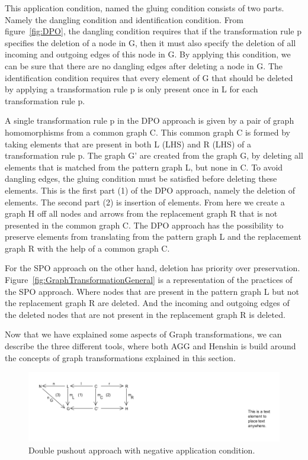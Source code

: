 \noindent This application condition, named the gluing condition\cite{Loewe1997}
consists of two parts. Namely the dangling condition and identification
condition. From figure~\ref{fig:DPO}, the dangling condition requires that if
the transformation rule p specifies the deletion of a node in G, then it must also
specify the deletion of all incoming and outgoing edges of this node in G. By
applying this condition, we can be sure that there are no dangling edges after
deleting a node in G. The identification condition requires that every element
of G that should be deleted by applying a transformation rule p is only present
once in L for each transformation rule p. 

A single transformation rule p in the DPO approach is given by a pair of graph
homomorphisms from a common graph C. This common graph C is formed by taking
elements that are present in both L (LHS) and R (LHS) of a transformation rule
p. The graph G' are created from the graph G, by deleting all elements that is
matched from the pattern graph L, but none in C. To avoid dangling edges,
the gluing condition must be satisfied before deleting these elements. This is
the first part (1) of the DPO approach, namely the deletion of elements. The
second part (2) is insertion of elements. From here we create a graph H off all
nodes and arrows from the replacement graph R that is not presented in the
common graph C. The DPO approach has the possibility to preserve elements from
translating from the pattern graph L and the replacement graph R with the help
of a common graph C.

For the SPO approach on the other hand, deletion has priority over preservation.
Figure~\ref{fig:GraphTransformationGeneral} is a representation of the practices
of the SPO approach. Where nodes that are present in the pattern graph L but not
the replacement graph R are deleted. And the incoming and outgoing edges of the
deleted nodes that are not present in the replacement graph R is deleted.

Now that we have explained some aspects of Graph transformations, we can
describe the three different tools, where both AGG and Henshin is build around
the concepts of graph transformations explained in this section. 

\begin{figure}[H]
	\centering
	\includegraphics[scale=0.7]{./Figures/Double_Pushout_NAC.png}
	\caption[The Double Pushout approach with NAC]
	{Double pushout approach with negative application condition.}
	\label{fig:DPO_NAC}
\end{figure}

